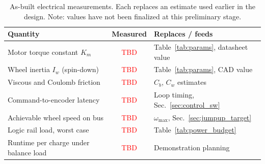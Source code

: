\begin{table}[htbp]
\centering
\caption[As-built electrical measurements]{As-built electrical measurements. Each replaces an estimate used
earlier in the design. Note: values have not been finalized at this preliminary stage. }
\label{tab:electrical_measured}
\small
\begin{tabular}{L{5.0cm} c L{5.4cm}}
\toprule
Quantity & Measured & Replaces / feeds \\
\midrule
Motor torque constant $K_m$    & \textcolor{red}{TBD} & Table~\ref{tab:params}, datasheet value \\
Wheel inertia $I_w$ (spin-down)& \textcolor{red}{TBD} & Table~\ref{tab:params}, CAD value \\
Viscous and Coulomb friction   & \textcolor{red}{TBD} & $C_b$, $C_w$ estimates \\
Command-to-encoder latency     & \textcolor{red}{TBD} & Loop timing, Sec.~\ref{sec:control_sw} \\
Achievable wheel speed on bus  & \textcolor{red}{TBD} & $\omega_{\max}$, Sec.~\ref{sec:jumpup_target} \\
Logic rail load, worst case    & \textcolor{red}{TBD} & Table~\ref{tab:power_budget} \\
Runtime per charge under balance load & \textcolor{red}{TBD} & Demonstration planning \\
\bottomrule
\end{tabular}
\end{table}

